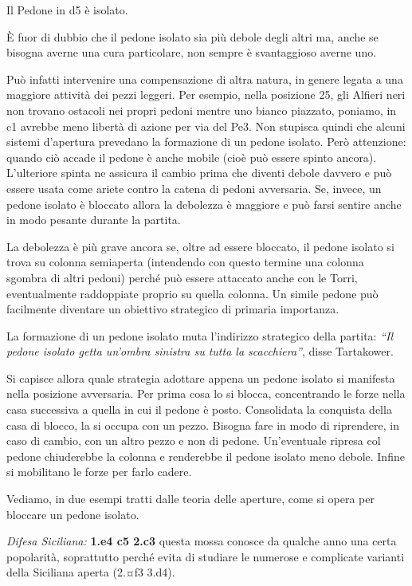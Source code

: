 Il Pedone in d5 è isolato.

È fuor di dubbio che il pedone isolato sia più debole degli altri ma,
anche se bisogna averne una cura particolare, non sempre è svantaggioso
averne uno.

Può infatti intervenire una compensazione di altra natura, in genere
legata a una maggiore attività dei pezzi leggeri. Per esempio, nella
posizione 25, gli Alfieri neri non trovano ostacoli nei propri pedoni
mentre uno bianco piazzato, poniamo, in c1 avrebbe meno libertà di
azione per via del Pe3. Non stupisca quindi che alcuni sistemi
d'apertura prevedano la formazione di un pedone isolato. Però
attenzione: quando ciò accade il pedone è anche mobile (cioè può essere
spinto ancora). L'ulteriore spinta ne assicura il cambio prima che
diventi debole davvero e può essere usata come ariete contro la catena
di pedoni avversaria. Se, invece, un pedone isolato è bloccato allora la
debolezza è maggiore e può farsi sentire anche in modo pesante durante
la partita.

La debolezza è più grave ancora se, oltre ad essere bloccato, il pedone
isolato si trova su colonna semiaperta (intendendo con questo termine
una colonna sgombra di altri pedoni) perché può essere attaccato anche
con le Torri, eventualmente raddoppiate proprio su quella colonna. Un
simile pedone può facilmente diventare un obiettivo strategico di
primaria importanza.

La formazione di un pedone isolato muta l'indirizzo strategico della
partita: \emph{``Il pedone isolato getta un'ombra sinistra su tutta la
scacchiera''}, disse Tartakower.

Si capisce allora quale strategia adottare appena un pedone isolato si
manifesta nella posizione avversaria. Per prima cosa lo si blocca,
concentrando le forze nella casa successiva a quella in cui il pedone è
posto. Consolidata la conquista della casa di blocco, la si occupa con
un pezzo. Bisogna fare in modo di riprendere, in caso di cambio, con un
altro pezzo e non di pedone. Un'eventuale ripresa col pedone chiuderebbe
la colonna e renderebbe il pedone isolato meno debole. Infine si
mobilitano le forze per farlo cadere.

Vediamo, in due esempi tratti dalle teoria delle aperture, come si opera
per bloccare un pedone isolato.

\emph{Difesa Siciliana:} \textbf{1.e4 c5 2.c3} questa mossa conosce da
qualche anno una certa popolarità, soprattutto perché evita di studiare
le numerose e complicate varianti della Siciliana aperta (2.¤f3 3.d4).

